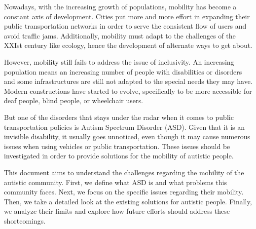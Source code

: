 
Nowadays, with the increasing growth of populations, mobility has become a constant axis of development. Cities put more and more effort in expanding their public transportation networks in order to serve the consistent flow of users and avoid traffic jams. Additionally, mobility must adapt to the challenges of the XXIst century like ecology, hence the development of alternate ways to get about.
\smallskip

However, mobility still fails to address the issue of inclusivity. An increasing population means an increasing number of people with disabilities or disorders and some infrastructures are still not adapted to the special needs they may have. Modern constructions have started to evolve, specifically to be more accessible for deaf people, blind people, or wheelchair users.
\smallskip

But one of the disorders that stays under the radar when it comes to public transportation policies is Autism Spectrum Disorder (ASD). Given that it is an invisible disability, it usually goes unnoticed, even though it may cause numerous issues when using vehicles or public transportation. These issues should be investigated in order to provide solutions for the mobility of autistic people.
\smallskip

This document aims to understand the challenges regarding the mobility of the autistic community. First, we define what ASD is and what problems this community faces. Next, we focus on the specific issues regarding their mobility. Then, we take a detailed look at the existing solutions for autistic people. Finally, we analyze their limits and explore how future efforts should address these shortcomings.
\smallskip

